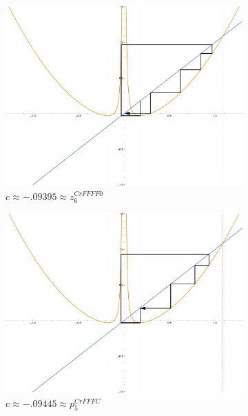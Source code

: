 \begin{figure}[ht]
		\begin{subfigure}[b]{0.3\textwidth}
				\includegraphics[width=\textwidth]{./img/plot-009395}
				\caption{$c \approx - .09395 \approx z_6^{CrFFFF0}$}
		\end{subfigure}
		\begin{subfigure}[b]{0.3\textwidth}
				\includegraphics[width=\textwidth]{./img/plot-009445}
				\caption{$c \approx -.09445 \approx p_5^{CrFFFC}$}
		\end{subfigure}
		\begin{subfigure}[b]{0.3\textwidth}

\end{subfigure}
\end{figure}
